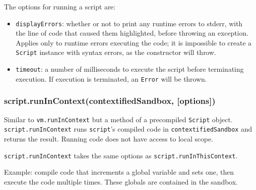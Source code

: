 The options for running a script are:

\begin{itemize}
\item
  \texttt{displayErrors}: whether or not to print any runtime errors to
  stderr, with the line of code that caused them highlighted, before
  throwing an exception. Applies only to runtime errors executing the
  code; it is impossible to create a \texttt{Script} instance with
  syntax errors, as the constructor will throw.
\item
  \texttt{timeout}: a number of milliseconds to execute the script
  before terminating execution. If execution is terminated, an
  \texttt{Error} will be thrown.
\end{itemize}

\subsubsection{script.runInContext(contextifiedSandbox, {[}options{]})}

Similar to \texttt{vm.runInContext} but a method of a precompiled
\texttt{Script} object. \texttt{script.runInContext} runs
\texttt{script}'s compiled code in \texttt{contextifiedSandbox} and
returns the result. Running code does not have access to local scope.

\texttt{script.runInContext} takes the same options as
\texttt{script.runInThisContext}.

Example: compile code that increments a global variable and sets one,
then execute the code multiple times. These globals are contained in the
sandbox.

\begin{Shaded}
\begin{Highlighting}[]
 \NormalTok{);}
 \NormalTok{);}

 
  \NormalTok{: }\NormalTok{,}
  \NormalTok{: }
\NormalTok{\};}

  \NormalTok{(}\NormalTok{);}

 \NormalTok{(} 
\NormalTok{\}}

\NormalTok{(}

\end{Highlighting}
\end{Shaded}

